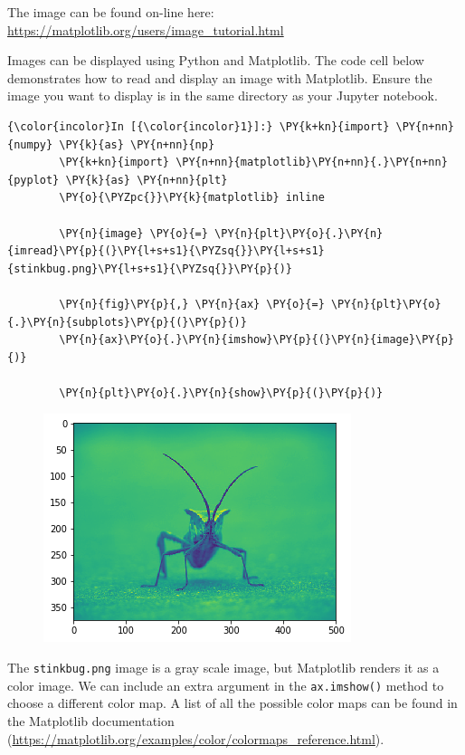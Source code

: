 \documentclass[11pt]{article}
\begin{document}
The image can be found on-line here:
\url{https://matplotlib.org/users/image_tutorial.html}

Images can be displayed using Python and Matplotlib. The code cell below
demonstrates how to read and display an image with Matplotlib. Ensure
the image you want to display is in the same directory as your Jupyter
notebook.

\begin{Verbatim}[commandchars=\\\{\}]
{\color{incolor}In [{\color{incolor}1}]:} \PY{k+kn}{import} \PY{n+nn}{numpy} \PY{k}{as} \PY{n+nn}{np}
        \PY{k+kn}{import} \PY{n+nn}{matplotlib}\PY{n+nn}{.}\PY{n+nn}{pyplot} \PY{k}{as} \PY{n+nn}{plt}
        \PY{o}{\PYZpc{}}\PY{k}{matplotlib} inline
        
        \PY{n}{image} \PY{o}{=} \PY{n}{plt}\PY{o}{.}\PY{n}{imread}\PY{p}{(}\PY{l+s+s1}{\PYZsq{}}\PY{l+s+s1}{stinkbug.png}\PY{l+s+s1}{\PYZsq{}}\PY{p}{)}
        
        \PY{n}{fig}\PY{p}{,} \PY{n}{ax} \PY{o}{=} \PY{n}{plt}\PY{o}{.}\PY{n}{subplots}\PY{p}{(}\PY{p}{)}
        \PY{n}{ax}\PY{o}{.}\PY{n}{imshow}\PY{p}{(}\PY{n}{image}\PY{p}{)}
        
        \PY{n}{plt}\PY{o}{.}\PY{n}{show}\PY{p}{(}\PY{p}{)}
\end{Verbatim}

\begin{figure}[!h]
\begin{center}
    \includegraphics[scale=0.5]{combined_files/combined_3_0.png}
\end{center}
\end{figure}
    
The \texttt{stinkbug.png} image is a gray scale image, but Matplotlib
renders it as a color image. We can include an extra argument in the
\texttt{ax.imshow()} method to choose a different color map. A list of
all the possible color maps can be found in the Matplotlib documentation
(\url{https://matplotlib.org/examples/color/colormaps_reference.html}).
\end{document}
